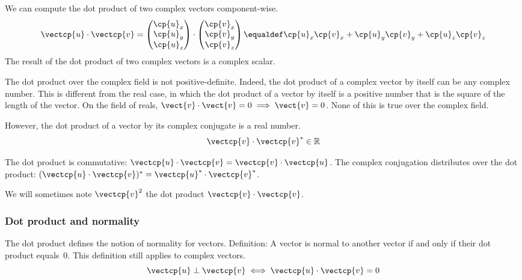 We can compute the dot product of two complex vectors component-wise.
\begin{equation}
    \vectcp{u} \cdot \vectcp{v}
    =
    \begin{pmatrix}
        \cp{u}_x \\ \cp{u}_y \\ \cp{u}_z
    \end{pmatrix}
    \cdot
    \begin{pmatrix}
        \cp{v}_x \\ \cp{v}_y \\ \cp{v}_z
    \end{pmatrix}
    \equaldef
    \cp{u}_x \cp{v}_x + \cp{u}_y \cp{v}_y + \cp{u}_z \cp{v}_z
\end{equation}
The result of the dot product of two complex vectors is a complex scalar.

The dot product over the complex field is not positive-definite.
Indeed, the dot product of a complex vector by itself can be any complex number.
This is different from the real case, in which the dot product of a vector by itself is a positive number that is the square of the length of the vector.
On the field of reals, $\vect{v} \cdot \vect{v}=0 \implies \vect{v}=0$.
None of this is true over the complex field.

However, the dot product of a vector by its complex conjugate is a real number.
\begin{equation}
    \vectcp{v} \cdot \vectcp{v}^* \in \mathbb{R}
\end{equation}

The dot product is commutative:
$\vectcp{u} \cdot \vectcp{v} = \vectcp{v} \cdot \vectcp{u}$.
The complex conjugation distributes over the dot product:
$(\vectcp{u} \cdot \vectcp{v})^* = \vectcp{u}^* \cdot \vectcp{v}^*$.

We will sometimes note $\vectcp{v}^2$ the dot product $\vectcp{v} \cdot \vectcp{v}$.

\subsubsection{Dot product and normality}

The dot product defines the notion of normality for vectors.
Definition: A vector is normal to another vector if and only if their dot product equals~$0$.
This definition still applies to complex vectors.
\begin{equation}
    \vectcp{u} \perp \vectcp{v}
    \iff
    \vectcp{u} \cdot \vectcp{v} = 0
\end{equation}

